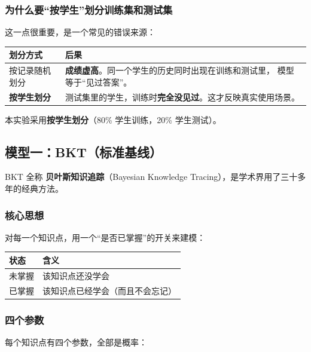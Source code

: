 \documentclass[UTF8,a4paper,11pt]{ctexart}
\newcommand{\term}[1]{\textbf{#1}}
\newcommand{\hl}[1]{\textcolor{blue!70!black}{\textbf{#1}}}
\newcommand{\warn}[1]{\textcolor{red!70!black}{\textbf{#1}}}
\begin{document}
\subsubsection{为什么要“按学生”划分训练集和测试集}

这一点很重要，是一个常见的错误来源：

\begin{center}
\begin{tabular}{p{5.0cm}p{8.8cm}}
\toprule
\textbf{划分方式} & \textbf{后果} \\
\midrule
按记录随机划分 & \warn{成绩虚高}。同一个学生的历史同时出现在训练和测试里，
模型等于“见过答案”。\\
\textbf{按学生划分} & 测试集里的学生，训练时\textbf{完全没见过}。这才反映真实使用场景。 \\
\bottomrule
\end{tabular}
\end{center}

本实验采用\hl{按学生划分}（80\% 学生训练，20\% 学生测试）。

\subsection{模型一：BKT（标准基线）}

BKT 全称 \term{贝叶斯知识追踪}（Bayesian Knowledge Tracing），是学术界用了三十多年的经典方法。

\subsubsection{核心思想}

对每一个知识点，用一个“是否已掌握”的开关来建模：

\begin{center}
\begin{tabular}{p{3.0cm}p{10.8cm}}
\toprule
\textbf{状态} & \textbf{含义} \\
\midrule
未掌握 & 该知识点还没学会 \\
已掌握 & 该知识点已经学会（而且不会忘记） \\
\bottomrule
\end{tabular}
\end{center}

\subsubsection{四个参数}

每个知识点有四个参数，全部是概率：
\end{document}
